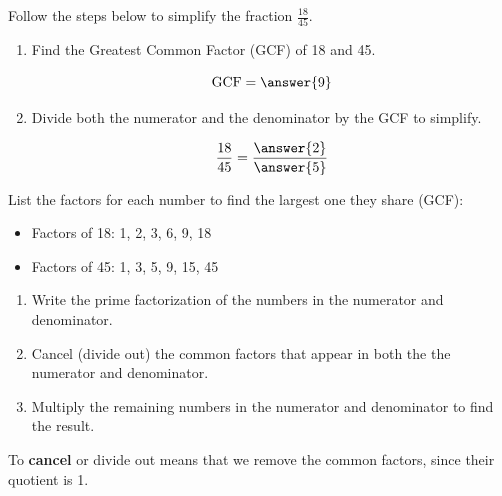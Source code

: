 \documentclass{ximera}[font=12pt]  %
\begin{document}
\begin{problem}
  Follow the steps below to simplify the fraction $\displaystyle \frac{18}{45}.$

  \begin{enumerate}
  \item Find the Greatest Common Factor (GCF) of 18 and 45.

  \[ \textrm{GCF} = \answer{9}  \]

  
  \item Divide both the numerator and the denominator by the GCF to simplify.

  \[ \frac{18}{45} = \frac{\answer{2}}{\answer{5}} \]

  \end{enumerate}

  \begin{hint}
    List the factors for each number to find the largest one they share (GCF):
    \begin{itemize}
        \item Factors of 18: 1, 2, 3, 6, 9, 18
        \item Factors of 45: 1, 3, 5, 9, 15, 45
    \end{itemize}
  \end{hint}
\end{problem}

\begin{procedure}

\begin{enumerate}
  \item Write the prime factorization of the numbers in the numerator and denominator.  

  \item Cancel (divide out) the common factors that appear in both the the numerator and denominator.

  \item Multiply the remaining numbers in the numerator and denominator to find the result.

\end{enumerate}

\end{procedure}

\begin{remark}
To \textbf{cancel} or divide out means that we remove the common factors, since their quotient is 1.
\end{remark}
\end{document}
